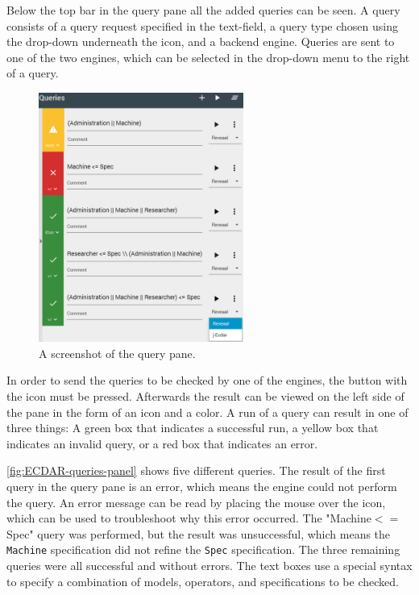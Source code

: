 Below the top bar in the query pane all the added queries can be seen. A query consists of a query request specified in the text-field, a query type chosen using the drop-down underneath the icon, and a backend engine. 
Queries are sent to one of the two engines, which can be selected in the drop-down menu to the right of a query. 
\begin{figure}[H]
    \centering
    \includegraphics[width=0.6\textwidth]{common/figures/right-panel.png}
    \caption{A screenshot of the query pane.}
    \label{fig:ECDAR-queries-panel}
\end{figure}

In order to send the queries to be checked by one of the engines, the button with the  icon must be pressed.
Afterwards the result can be viewed on the left side of the pane in the form of an icon and a color.
A run of a query can result in one of three things: A green box that indicates a successful run, a yellow box that indicates an invalid query, or a red box that indicates an error.

\autoref{fig:ECDAR-queries-panel} shows five different queries. 
The result of the first query in the query pane is an error, which means the engine could not perform the query. 
An error message can be read by placing the mouse over the icon, which can be used to troubleshoot why this error occurred.
The "Machine$<=$Spec" query was performed, but the result was unsuccessful, which means the \texttt{Machine} specification did not refine the \texttt{Spec} specification.
The three remaining queries were all successful and without errors.
The text boxes use a special syntax to specify a combination of models, operators, and specifications to be checked.





